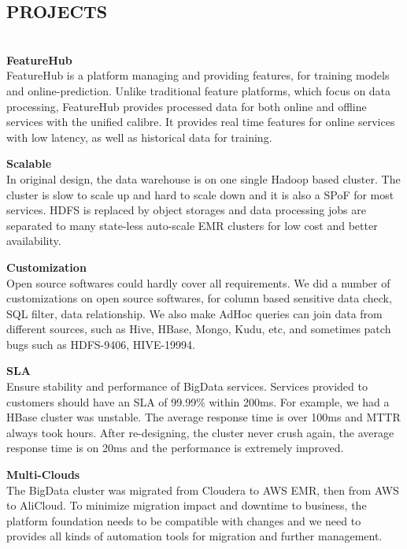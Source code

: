 \documentclass{res}
\begin{document}
\begin{resume}
\section{{PROJECTS}}
\vspace{-10pt}
\hrulefill\\
{\bf FeatureHub} \\
FeatureHub is a platform managing and providing features, for training models and online-prediction. Unlike traditional feature platforms, which focus on data processing, FeatureHub provides processed data for both online and offline services with the unified calibre. It provides real time features for online services with low latency, as well as historical data for training.

\vspace{-5pt}
{\bf Scalable} \\
In original design, the data warehouse is on one single Hadoop based cluster. 
The cluster is slow to scale up and hard to scale down and it is also a SPoF for most services.
HDFS is replaced by object storages and data processing jobs are separated to many state-less auto-scale EMR clusters for low cost and better availability. 

\vspace{-5pt}
{\bf Customization}\\
Open source softwares could hardly cover all requirements.
We did a number of customizations on open source softwares, for column based sensitive data check, SQL filter, data relationship. We also make AdHoc queries can join data from different sources, such as Hive, HBase, Mongo, Kudu, etc, and sometimes patch bugs such as HDFS-9406, HIVE-19994. 

\vspace{-5pt}
{\bf SLA}\\
Ensure stability and performance of BigData services. Services provided to customers should have an SLA of 99.99\% within 200ms.
For example, we had a HBase cluster was unstable. The average response time is over 100ms and MTTR always took hours. After re-designing, the cluster never crush again, the average response time is on 20ms and the performance is extremely improved. 

\vspace{-5pt}
{\bf Multi-Clouds} \\ 
The BigData cluster was migrated from Cloudera to AWS EMR, then from AWS to AliCloud. 
To minimize migration impact and downtime to business, the platform foundation needs to be compatible with changes and we need to provides all kinds of automation tools for migration and further management. 


\end{resume}
\end{document}

